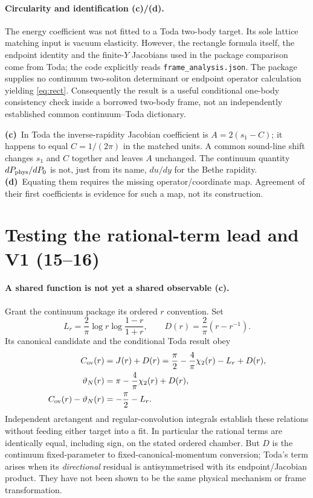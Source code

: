 \documentclass[11pt,a4paper]{article}
\newcommand{\Lc}{\textbf{(c)}\ }
\newcommand{\Ld}{\textbf{(d)}\ }
\newcommand{\file}[1]{\nolinkurl{#1}}
\begin{document}
\paragraph{Circularity and identification (c)/(d).}
The energy coefficient was not fitted to a Toda two-body target. Its sole
lattice matching input is vacuum elasticity. However, the rectangle formula
itself, the endpoint identity and the finite-$Y$ Jacobians used in the
package comparison come from Toda; the code explicitly reads
\file{frame_analysis.json}. The package supplies no continuum two-soliton
determinant or endpoint operator calculation yielding \eqref{eq:rect}.
Consequently the result is a useful conditional one-body consistency check
inside a borrowed two-body frame, not an independently established common
continuum--Toda dictionary.

\Lc In Toda the inverse-rapidity Jacobian coefficient is
$A=2(s_1-C)$; it happens to equal $C=1/(2\pi)$ in the matched units.
A common sound-line shift changes $s_1$ and $C$ together and leaves $A$
unchanged. The continuum quantity $dP_{\rm phys}/dP_0$ is not, just from its
name, $du/dy$ for the Bethe rapidity. \Ld Equating them requires the missing
operator/coordinate map. Agreement of their first coefficients is evidence
for such a map, not its construction.

\section{Testing the rational-term lead and V1 (15--16)}
\paragraph{A shared function is not yet a shared observable (c).}
Grant the continuum package its ordered $r$ convention. Set
\[
 L_r=\frac2\pi\log r\log\frac{1-r}{1+r},\qquad
 D(r)=\frac2\pi(r-r^{-1}).
\]
Its canonical candidate and the conditional Toda result obey
\begin{align}
 C_{\rm ov}(r)&=J(r)+D(r)
 =\frac\pi2-\frac4\pi\chi_2(r)-L_r+D(r),\\
 \vartheta_N(r)&=\pi-\frac4\pi\chi_2(r)+D(r),\\
 C_{\rm ov}(r)-\vartheta_N(r)&=-\frac\pi2-L_r.
 \label{eq:gap}
\end{align}
Independent arctangent and regular-convolution integrals establish these
relations without feeding either target into a fit. In particular the rational
terms are identically equal, including sign, on the stated ordered chamber.
But $D$ is the continuum fixed-parameter to fixed-canonical-momentum
conversion; Toda's term arises when its \emph{directional} residual is
antisymmetrised with its endpoint/Jacobian product. They have not been shown
to be the same physical mechanism or frame transformation.
\end{document}
